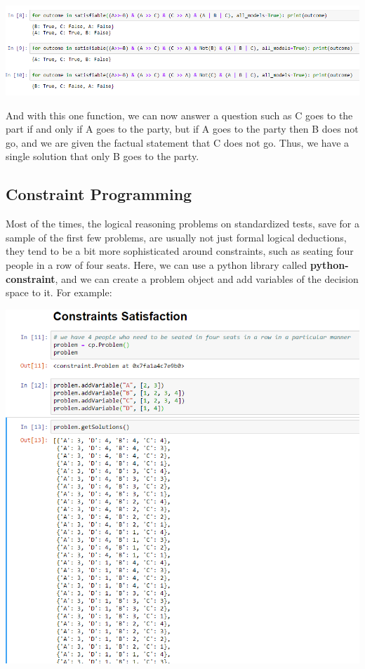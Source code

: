 \documentclass[a4paper,10pt]{extarticle}
\begin{document}
\begin{multicols}{2}
            \smallskip
            \includegraphics[scale=0.3]{screen2.png}

            And with this one function, we can now answer a question such as C goes to the part if and only if A goes to the party, but if A goes to the party then B does not go, and we are given the factual statement that C does not go. Thus, we have a single solution that only B goes to the party. 

            \smallskip

            \subsection{Constraint Programming}
            Most of the times, the logical reasoning problems on standardized tests, save for a sample of the first few problems, are usually not just formal logical deductions, they tend to be a bit more sophisticated around constraints, such as seating four people in a row of four seats. Here, we can use a python library called \textbf{python-constraint}, and we can create a problem object and add variables of the decision space to it. For example:

            \smallskip
            \includegraphics[scale=0.35]{screen3.png}



\end{multicols}
\end{document}
